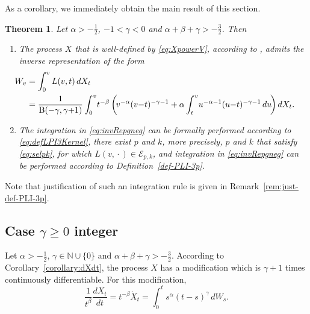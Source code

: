 \documentclass{article}
\newcommand{\dotX}{\dot{X}}
\newcommand{\vS}{v}
\theoremstyle{plain}
\newtheorem{theorem}{Theorem}
\theoremstyle{remark}
\theoremstyle{definition}
\begin{document}
As a  corollary, we immediately obtain the main result of this section.
\begin{theorem}
	Let $\alpha\mathbin{>}-\frac12$,
	${-}1\mathbin{<}\gamma\mathbin{<}0$
	and $\alpha+\beta+\gamma\mathbin{>}{-}\frac32$.
	Then
	\begin{enumerate}
		 
			 
		\item
			The process $X$ that is well-defined by
			\eqref{eq:XpowerV},
			according to \cite[Theorem~1]{Part 1}, admits the inverse representation of the form
			\begin{align}
				\hspace{-20.5pt}W_v &= \int_0^v L(v,t)\, dX_t
				\nonumber \\ \hspace{-6.3pt}&=
				\frac{1}{\mathrm{B}(-\gamma, \gamma{+}1)}
				\int_0^v \! t^{-\beta}
				\left(\!\vS^{-\alpha} (\vS{-}t)^{-\gamma-1}
				+ \alpha \int_t^\vS \! u^{-\alpha-1}
				(u{-}t)^{-\gamma-1} \,du \!\right)
				dX_t .
				\label{eq:invRepgneg}
			\end{align}
		\item
			The integration in \eqref{eq:invRepgneg}
			can be formally performed according
			to \eqref{eq:defLPI3Kernel}, there exist $p$ and $k$, more precisely,   $p$ and $k$
			that satisfy \eqref{eq:selpk},
			for which $L(v,{{}\mathbin{\cdot}{}})  \in
			\mathcal{E}_{p,k}$, and integration
			in \eqref{eq:invRepgneg} can be performed
			according to Definition~\ref{def-PLI-3p}.
			
	\end{enumerate}
\end{theorem}

Note that justification of such an integration rule
			is given in Remark~\ref{rem:just-def-PLI-3p}.

\subsection[Case $\gamma\ge 0$ integer]
{Case \boldmath$\gamma\ge 0$ integer}
\label{ss:invrepgammainteger}
Let $\alpha>-\frac12$, $\gamma\in\mathbb{N}\cup\{0\}$
and $\alpha+\beta+\gamma\mathbin{>}{-}\frac32$.
According to Corollary~\ref{corollary:dXdt},
the process $X$ has a modification
which is $\gamma{+}1$ times
continuously differentiable.
For this modification,
\begin{equation}\label{eq:t-bXtdt}
	\frac{1}{t^\beta} \frac{d X_t}{dt} = t^{-\beta} \dotX_t
	= \int_0^t s^\alpha (t-s)^\gamma \, dW_s .
\end{equation}
\end{document}
